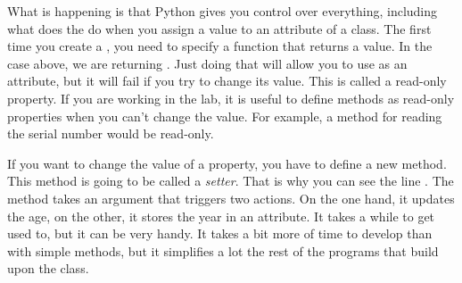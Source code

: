 What is happening is that Python gives you control over everything, including what does the \py{=} do when you assign a value to an attribute of a class. The first time you create a , you need to specify a function that returns a value. In the case above, we are returning . Just doing that will allow you to use  as an attribute, but it will fail if you try to change its value. This is called a read-only property. If you are working in the lab, it is useful to define methods as read-only properties when you can't change the value. For example, a method for reading the serial number would be read-only. 

If you want to change the value of a property, you have to define a new method. This method is going to be called a \textit{setter}. That is why you can see the line . The method takes an argument that triggers two actions. On the one hand, it updates the age, on the other, it stores the year in an attribute. It takes a while to get used to, but it can be very handy. It takes a bit more of time to develop than with simple methods, but it simplifies a lot the rest of the programs that build upon the class. 
